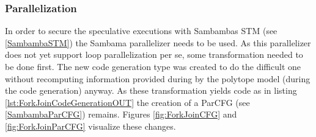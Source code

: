 \subsubsection*{Parallelization}

In order to secure the speculative executions with Sambambas STM
(see \ref{SambambaSTM}) the Sambama parallelizer needs to be used.
As this parallelizer does not yet support loop parallelization per se, some 
transformation needed to be done first. The new code generation type was created
to do the difficult one without recomputing information provided during by the
polytope model (during the code generation) anyway. As these transformation
yields code as in listing \ref{lst:ForkJoinCodeGenerationOUT} the creation of
a ParCFG (see \ref{SambambaParCFG}) remains. Figures \ref{fig:ForkJoinCFG} and
\ref{fig:ForkJoinParCFG} visualize these changes.


